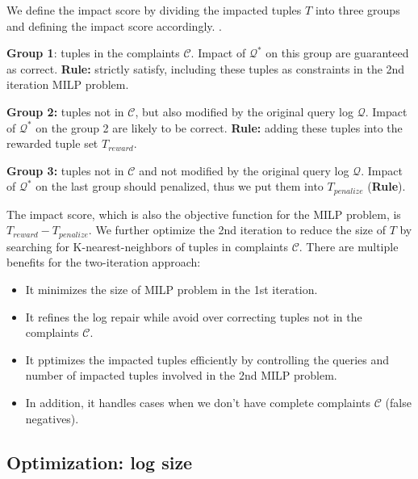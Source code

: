 We define the impact score by dividing the 
impacted tuples $T$ into three groups and defining the 
impact score accordingly. . 

\smallskip

\noindent\textbf{Group 1}: tuples in the complaints $\mathcal{C}$. Impact of 
$\mathcal{Q}^*$ on this group
are guaranteed as correct. \textbf{Rule:} 
strictly satisfy, including these tuples as 
constraints in the 2nd iteration MILP problem. 

\smallskip

\noindent\textbf{Group 2:} tuples not in $\mathcal{C}$, but also modified 
by the original query log $\mathcal{Q}$. Impact of $\mathcal{Q}^*$ 
on the group 2 are likely to
be correct. \textbf{Rule:} adding these tuples into the 
rewarded tuple set $T_{reward}$. 

\smallskip

\noindent\textbf{Group 3:} tuples not in $\mathcal{C}$ and not modified 
by the original query log $\mathcal{Q}$. Impact of 
$\mathcal{Q}^*$ on the last group should penalized, thus 
we put them into $T_{penalize}$ (\textbf{Rule}).

\smallskip

The impact score, which is also the objective function for
the MILP problem, is $T_{reward} - T_{penalize}$. We further 
optimize the 2nd iteration to reduce the size of $T$ 
by searching for K-nearest-neighbors
of tuples in complaints $\mathcal{C}$. 
There are multiple benefits for the two-iteration approach:
\begin{itemize}
\item It minimizes the size of MILP problem in the 1st iteration. 
\item It refines the log repair while avoid over correcting tuples not in 
the complaints $\mathcal{C}$. 
\item It pptimizes the impacted tuples efficiently by controlling the queries 
and number of impacted tuples
involved in the 2nd MILP problem.
\item In addition, it handles cases when we don't have complete complaints
$\mathcal{C}$ (false negatives). 
\end{itemize}
\subsection{Optimization: log size}



